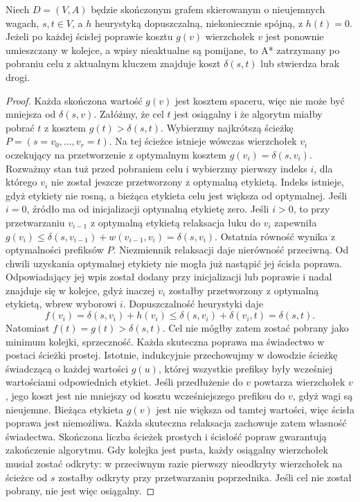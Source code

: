 \begin{twierdzenie}
\label{thm:tg-weighted-astar-reopen}
Niech $D=(V,A)$ będzie skończonym grafem skierowanym
o nieujemnych wagach, $s,t\in V$, a $h$ heurystyką
dopuszczalną, niekoniecznie spójną, z $h(t)=0$.
Jeżeli po każdej ścisłej poprawie kosztu $g(v)$
wierzchołek $v$ jest ponownie umieszczany w kolejce,
a wpisy nieaktualne są pomijane, to A* zatrzymany
po pobraniu celu z aktualnym kluczem znajduje
koszt $\delta(s,t)$ lub stwierdza brak drogi.
\end{twierdzenie}
\begin{proof}
Każda skończona wartość $g(v)$ jest kosztem spaceru,
więc nie może być mniejsza od $\delta(s,v)$.
Załóżmy, że cel $t$ jest osiągalny i że
algorytm miałby pobrać $t$ z kosztem
$g(t)>\delta(s,t)$. Wybierzmy najkrótszą ścieżkę
$P=(s=v_0,\ldots,v_r=t)$. Na tej ścieżce
istnieje wówczas wierzchołek $v_i$ oczekujący
na przetworzenie z optymalnym kosztem
$g(v_i)=\delta(s,v_i)$.
Rozważmy stan tuż przed pobraniem celu i wybierzmy
pierwszy indeks $i$, dla którego $v_i$ nie został jeszcze
przetworzony z optymalną etykietą. Indeks istnieje,
gdyż etykiety nie rosną, a bieżąca etykieta celu jest
większa od optymalnej. Jeśli $i=0$, źródło ma od
inicjalizacji optymalną etykietę zero. Jeśli $i>0$,
to przy przetwarzaniu $v_{i-1}$ z optymalną etykietą
relaksacja łuku do $v_i$ zapewniła
$g(v_i)\leq\delta(s,v_{i-1})+w(v_{i-1},v_i)=\delta(s,v_i)$.
Ostatnia równość wynika z optymalności prefiksów $P$.
Niezmiennik relaksacji daje nierówność przeciwną.
Od chwili uzyskania optymalnej etykiety nie mogła już
nastąpić jej ścisła poprawa. Odpowiadający jej wpis
został dodany przy inicjalizacji lub poprawie i nadal
znajduje się w kolejce, gdyż inaczej $v_i$ zostałby
przetworzony z optymalną etykietą, wbrew wyborowi $i$.
Dopuszczalność heurystyki daje
\[
f(v_i)=\delta(s,v_i)+h(v_i)
\leq\delta(s,v_i)+\delta(v_i,t)=\delta(s,t).
\]
Natomiast $f(t)=g(t)>\delta(s,t)$.
Cel nie mógłby zatem zostać pobrany jako minimum
kolejki, sprzeczność. Każda skuteczna poprawa ma świadectwo w postaci
ścieżki prostej. Istotnie, indukcyjnie przechowujmy
w dowodzie ścieżkę świadczącą o każdej wartości $g(u)$,
której wszystkie prefiksy były wcześniej wartościami
odpowiednich etykiet. Jeśli przedłużenie do $v$ powtarza
wierzchołek $v$, jego koszt jest nie mniejszy od kosztu
wcześniejszego prefiksu do $v$, gdyż wagi są nieujemne.
Bieżąca etykieta $g(v)$ jest nie większa od tamtej
wartości, więc ścisła poprawa jest niemożliwa.
Każda skuteczna relaksacja zachowuje zatem własność
świadectwa. Skończona liczba ścieżek prostych i ścisłość
popraw gwarantują zakończenie algorytmu. Gdy kolejka
jest pusta, każdy osiągalny wierzchołek musiał zostać
odkryty: w przeciwnym razie pierwszy nieodkryty
wierzchołek na ścieżce od $s$ zostałby odkryty przy
przetwarzaniu poprzednika. Jeśli cel nie został pobrany,
nie jest więc osiągalny.
\end{proof}

